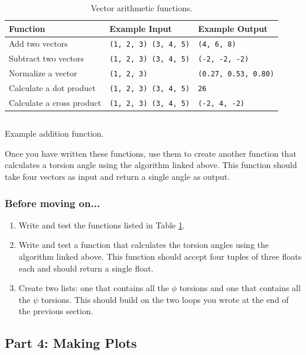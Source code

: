 \documentclass{article}
\newcommand{\bbphi}{\ensuremath{\phi}}
\newcommand{\bbpsi}{\ensuremath{\psi}}
\newenvironment{problems}
{\subsubsection{Before moving on...} \begin{enumerate}}
{\end{enumerate}}
\begin{document}
\begin{table}[h]
\centering
\begin{tabular}{lll}
\toprule
Function                  & Example Input                & Example Output              \\
\midrule
Add two vectors           &
 \texttt{(1, 2, 3) (3, 4, 5)} & \texttt{(4, 6, 8)}          \\
Subtract two vectors      &
 \texttt{(1, 2, 3) (3, 4, 5)} & \texttt{(-2, -2, -2)}       \\
Normalize a vector        &
 \texttt{(1, 2, 3)}           & \texttt{(0.27, 0.53, 0.80)} \\
Calculate a dot product   &
 \texttt{(1, 2, 3) (3, 4, 5)} & \texttt{26}                 \\
Calculate a cross product &
 \texttt{(1, 2, 3) (3, 4, 5)} & \texttt{(-2, 4, -2)}        \\
\bottomrule
\end{tabular}
\caption{Vector arithmetic functions.}
\label{tab:vector-functions}
\end{table}

\begin{listing}[h]
 \inputminted{python}{example-function.py}
 \caption{Example addition function.}
 \label{lst:example-function}
\end{listing}

Once you have written these functions, use them to create another function that 
calculates a torsion angle using the algorithm linked above.  This function 
should take four vectors as input and return a single angle as output.  

\begin{problems}
 \item Write and test the functions listed in Table \ref{tab:vector-functions}.
 \item Write and test a function that calculates the torsion angles using the 
  algorithm linked above.  This function should accept four tuples of three 
  floats each and should return a single float.
 \item Create two lists: one that contains all the \bbphi{} torsions and one 
  that contains all the \bbpsi{} torsions.  This should build on the two loops 
  you wrote at the end of the previous section.
\end{problems}

\subsection{Part 4: Making Plots}
\end{document}
